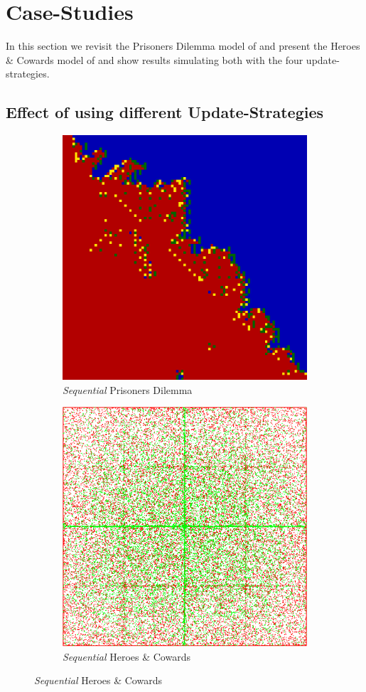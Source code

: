 \section{Case-Studies}
In this section we revisit the Prisoners Dilemma model of \cite{nowak_evolutionary_1992} and present the Heroes \& Cowards model of \cite{wilensky_introduction_2015} and show results simulating both with the four update-strategies. 

\subsection{Effect of using different Update-Strategies}
\begin{figure}

	\centering
	
    \begin{subfigure}[b]{0.4\textwidth}
		\centering
       	\includegraphics[width=.7\textwidth, angle=0]{./fig/seq_99x99_436steps_MSG_haskell.png}
        \caption{\textit{Sequential} Prisoners Dilemma}
        \label{fig:pd_seq}
    \end{subfigure}
    \begin{subfigure}[b]{0.4\textwidth}
    	\centering
        \includegraphics[width=.7\textwidth, angle=0]{./fig/seq_HAC_100_000_500steps_java.png}
        \caption{\textit{Sequential} Heroes \& Cowards}
        \label{fig:hac_seq}
    \end{subfigure}
       


\end{figure}
